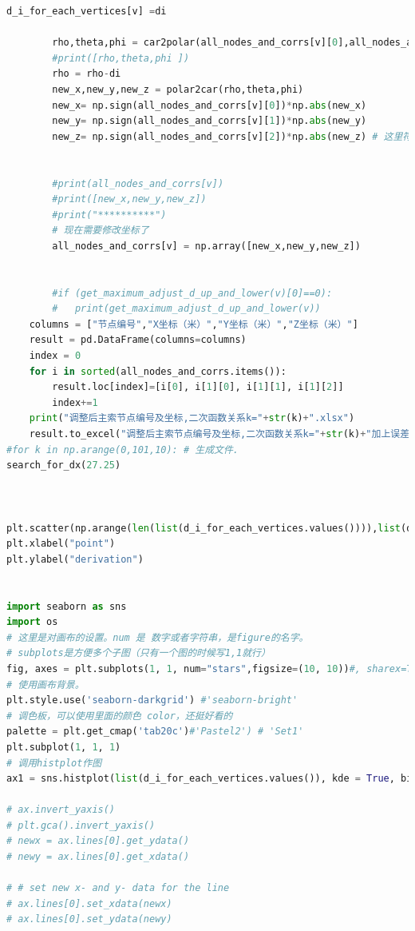 \documentclass[withoutpreface,bwprint]{cumcmthesis} %
\begin{document}
\begin{appendices}
\begin{lstlisting}[language=python]
        d_i_for_each_vertices[v] =di 
        
        rho,theta,phi = car2polar(all_nodes_and_corrs[v][0],all_nodes_and_corrs[v][1],all_nodes_and_corrs[v][2])
        #print([rho,theta,phi ])
        rho = rho-di
        new_x,new_y,new_z = polar2car(rho,theta,phi)
        new_x= np.sign(all_nodes_and_corrs[v][0])*np.abs(new_x)
        new_y= np.sign(all_nodes_and_corrs[v][1])*np.abs(new_y)
        new_z= np.sign(all_nodes_and_corrs[v][2])*np.abs(new_z) # 这里符号计算有点问题，但是小幅度的转换并不会影响到角度
        
        
        #print(all_nodes_and_corrs[v])
        #print([new_x,new_y,new_z])
        #print("**********")
        # 现在需要修改坐标了
        all_nodes_and_corrs[v] = np.array([new_x,new_y,new_z])
        
        
        #if (get_maximum_adjust_d_up_and_lower(v)[0]==0):
        #   print(get_maximum_adjust_d_up_and_lower(v))
    columns = ["节点编号","X坐标（米）","Y坐标（米）","Z坐标（米）"]
    result = pd.DataFrame(columns=columns)
    index = 0
    for i in sorted(all_nodes_and_corrs.items()):
        result.loc[index]=[i[0], i[1][0], i[1][1], i[1][2]]  
        index+=1
    print("调整后主索节点编号及坐标,二次函数关系k="+str(k)+".xlsx")
    result.to_excel("调整后主索节点编号及坐标,二次函数关系k="+str(k)+"加上误差.xlsx",index=False)
#for k in np.arange(0,101,10): # 生成文件.
search_for_dx(27.25)



plt.scatter(np.arange(len(list(d_i_for_each_vertices.values()))),list(d_i_for_each_vertices.values()))
plt.xlabel("point")
plt.ylabel("derivation")


import seaborn as sns
import os
# 这里是对画布的设置。num 是 数字或者字符串，是figure的名字。
# subplots是方便多个子图（只有一个图的时候写1,1就行）
fig, axes = plt.subplots(1, 1, num="stars",figsize=(10, 10))#, sharex=True)
# 使用画布背景。
plt.style.use('seaborn-darkgrid') #'seaborn-bright'
# 调色板，可以使用里面的颜色 color，还挺好看的
palette = plt.get_cmap('tab20c')#'Pastel2') # 'Set1' 
plt.subplot(1, 1, 1)
# 调用histplot作图
ax1 = sns.histplot(list(d_i_for_each_vertices.values()), kde = True, bins = 100, shrink = 1, color = palette.colors[0], edgecolor = palette.colors[-1])#"none")#, element="step")# element = "poly") # cumulative = True)

# ax.invert_yaxis() 
# plt.gca().invert_yaxis()
# newx = ax.lines[0].get_ydata()
# newy = ax.lines[0].get_xdata()

# # set new x- and y- data for the line
# ax.lines[0].set_xdata(newx)
# ax.lines[0].set_ydata(newy)


\end{lstlisting}
\end{appendices}
\end{document}

